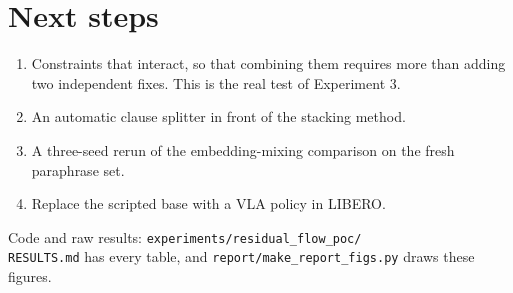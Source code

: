\documentclass[11pt]{article}
\begin{document}
\section{Next steps}

\begin{enumerate}
  \item Constraints that interact, so that combining them requires more than adding two
        independent fixes. This is the real test of Experiment 3.
  \item An automatic clause splitter in front of the stacking method.
  \item A three-seed rerun of the embedding-mixing comparison on the fresh paraphrase set.
  \item Replace the scripted base with a VLA policy in LIBERO.
\end{enumerate}

\vspace{1em}
\noindent\small Code and raw results: \texttt{experiments/residual\_flow\_poc/}
\\
\texttt{RESULTS.md} has every table, and \texttt{report/make\_report\_figs.py} draws these figures.
\end{document}
